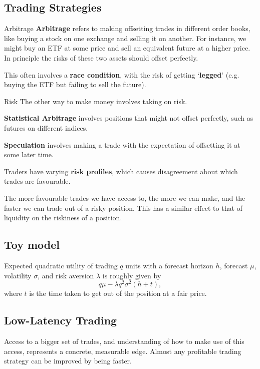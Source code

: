 \documentclass{article}
\begin{document}
\subsection{Trading Strategies}
\begin{block}{Arbitrage}
	\textbf{Arbitrage} refers to making offsetting trades in different order books, like buying a stock on one exchange and selling it on another. For instance, we might buy an ETF at some price and sell an equivalent future at a higher price. In principle the risks of these two assets should offset perfectly.

	This often involves a \textbf{race condition}, with the risk of getting `\textbf{legged}' (e.g. buying the ETF but failing to sell the future).
\end{block}

\begin{block}{Risk}
	The other way to make money involves taking on risk.

	\textbf{Statistical Arbitrage} involves positions that might not offset perfectly, such as futures on different indices.

	\textbf{Speculation} involves making a trade with the expectation of offsetting it at some later time.

	Traders have varying \textbf{risk profiles}, which causes disagreement about which trades are favourable.

	The more favourable trades we have access to, the more we can make, and the faster we can trade out of a risky position. This has a similar effect to that of liquidity on the riskiness of a position.
\end{block}

\subsection{Toy model}
Expected quadratic utility of trading $q$ units with a forecast horizon $h$, forecast $\mu$, volatility $\sigma$, and risk aversion $\lambda$ is roughly given by
$$q \mu-\lambda q^2 \sigma^2(h+t),$$
where $t$ is the time taken to get out of the position at a fair price.

\subsection{Low-Latency Trading}
Access to a bigger set of trades, and understanding of how to make use of this access, represents a concrete, measurable edge. Almost any profitable trading strategy can be improved by being faster.
\end{document}
